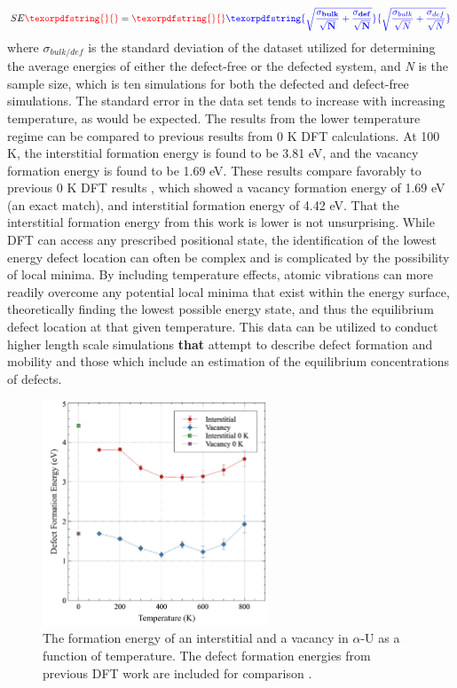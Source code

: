 \documentclass[utf8]{frontiersSCNS} %
\providecommand{\DIFaddtex}[1]{{\bf #1}} %
\providecommand{\DIFdeltex}[1]{} %
\providecommand{\DIFaddbegin}{\protect\color{blue}} %
\providecommand{\DIFaddend}{\protect\color{black}} %
\providecommand{\DIFdelbegin}{\protect\color{red}} %
\providecommand{\DIFdelend}{\protect\color{black}} %
\providecommand{\DIFadd}[1]{\texorpdfstring{\DIFaddtex{#1}}{#1}} %
\providecommand{\DIFdel}[1]{\texorpdfstring{\DIFdeltex{#1}}{}} %
\begin{document}
\begin{equation}
\label{eq:surf}
SE \DIFdelbegin \DIFdel{^2 }\DIFdelend = \DIFdelbegin \DIFdel{\frac{\sigma_{bulk}}{\sqrt{N}} + \frac{\sigma_{def}}{\sqrt{N}}
}\DIFdelend \DIFaddbegin \DIFadd{\sqrt{\frac{\sigma_{bulk}}{\sqrt{N}} + \frac{\sigma_{def}}{\sqrt{N}}}
}\DIFaddend \end{equation}where $\sigma_{bulk/def}$ is the standard deviation of the dataset utilized for determining the average energies of either the defect-free or the defected system, and \textit{N} is the sample size, which is ten simulations for both the defected and defect-free simulations. The standard error in the data set tends to increase with increasing temperature, as would be expected. The results from the lower temperature regime can be compared to previous results from 0 K DFT calculations. At 100 K, the interstitial formation energy is found to be 3.81 eV, and the vacancy formation energy is found to be 1.69 eV. These results compare favorably to previous 0 K DFT results \cite{wirth2011}, which showed a vacancy formation energy of 1.69 eV (an exact match), and interstitial formation energy of 4.42 eV. That the interstitial formation energy from this work is lower is not unsurprising. While DFT can access any prescribed positional state, the identification of the lowest energy defect location can often be complex \DIFdelbegin \DIFdel{, }\DIFdelend and is complicated by the possibility of local minima. By including temperature effects, atomic vibrations can more readily overcome any potential local minima that exist within the energy surface, theoretically finding the lowest possible energy state, and thus the equilibrium defect location at that given temperature. This data can be utilized to conduct higher length scale simulations \DIFdelbegin \DIFdel{which }\DIFdelend \DIFaddbegin \DIFadd{that }\DIFaddend attempt to describe defect formation and mobility and those which include an estimation of the equilibrium concentrations of defects. 

 \begin{figure}[hbt]
	\centering
	\includegraphics[width=0.6\textwidth]{defect_eform.jpg}
  \caption{The formation energy of an interstitial and a vacancy in $\alpha$-U as a function of temperature. The defect formation energies from previous DFT work are included for comparison \cite{wirth2011}.}\label{fig:defs}
\end{figure}
\end{document}
